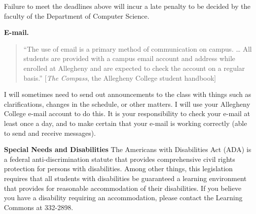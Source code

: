 \begin{description}
Failure to meet the deadlines above will incur a late penalty to be decided by
the faculty of the Department of Computer Science.


\item{\bf E-mail.}
\begin{quote}
``The use of email is a primary method of communication on campus. \ldots
All students are provided with a campus email account and address while
enrolled at Allegheny and are expected to check the account on a regular
basis.'' [{\em The Compass}, the Allegheny College student handbook]
\end{quote}
I will sometimes need to send out announcements to the class with
things such as clarifications, changes in the
schedule, or other matters. I will use your Allegheny College e-mail account
to do this. It is your responsibility to check your e-mail at least once a
day, and to make certain that your e-mail is working correctly (able to send
and receive messages).

\item{\bf Special Needs and Disabilities}
The Americans with Disabilities Act (ADA) is a federal anti-discrimination
statute that provides comprehensive civil rights protection for persons
with disabilities. Among other things, this legislation requires that
all students with disabilities be guaranteed a learning environment
that provides for reasonable accommodation of their disabilities.
If you believe  you have a disability requiring an accommodation,
please contact the Learning Commons at 332-2898.
\end{description}


